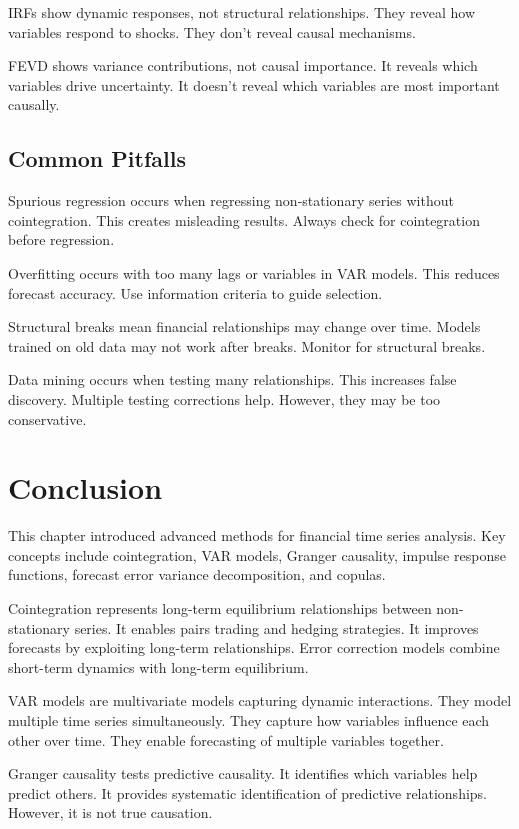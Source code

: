 IRFs show dynamic responses, not structural relationships. They reveal how variables respond to shocks. They don't reveal causal mechanisms.

FEVD shows variance contributions, not causal importance. It reveals which variables drive uncertainty. It doesn't reveal which variables are most important causally.

\subsection{Common Pitfalls}

Spurious regression occurs when regressing non-stationary series without cointegration. This creates misleading results. Always check for cointegration before regression.

Overfitting occurs with too many lags or variables in VAR models. This reduces forecast accuracy. Use information criteria to guide selection.

Structural breaks mean financial relationships may change over time. Models trained on old data may not work after breaks. Monitor for structural breaks.

Data mining occurs when testing many relationships. This increases false discovery. Multiple testing corrections help. However, they may be too conservative.

\section{Conclusion}

This chapter introduced advanced methods for financial time series analysis. Key concepts include cointegration, VAR models, Granger causality, impulse response functions, forecast error variance decomposition, and copulas.

Cointegration represents long-term equilibrium relationships between non-stationary series. It enables pairs trading and hedging strategies. It improves forecasts by exploiting long-term relationships. Error correction models combine short-term dynamics with long-term equilibrium.

VAR models are multivariate models capturing dynamic interactions. They model multiple time series simultaneously. They capture how variables influence each other over time. They enable forecasting of multiple variables together.

Granger causality tests predictive causality. It identifies which variables help predict others. It provides systematic identification of predictive relationships. However, it is not true causation.

